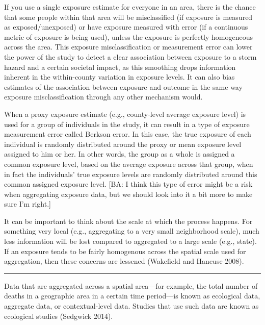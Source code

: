 \documentclass[]{article}
\begin{document}
If you use a single exposure estimate for everyone in an area, there is
the chance that some people within that area will be misclassified (if
exposure is measured as exposed/unexposed) or have exposure measured
with error (if a continuous metric of exposure is being used), unless
the exposure is perfectly homogeneous across the area. This exposure
misclassification or measurement error can lower the power of the study
to detect a clear association between exposure to a storm hazard and a
certain societal impact, as this smoothing drops information inherent in
the within-county variation in exposure levels. It can also bias
estimates of the association between exposure and outcome in the same
way exposure misclassification through any other mechanism would.

When a proxy exposure estimate (e.g., county-level average exposure
level) is used for a group of individuals in the study, it can result in
a type of exposure measurement error called Berkson error. In this case,
the true exposure of each individual is randomly distributed around the
proxy or mean exposure level assigned to him or her. In other words, the
group as a whole is assigned a common exposure level, based on the
average exposure across that group, when in fact the individuals' true
exposure levels are randomly distributed around this common assigned
exposure level. {[}BA: I think this type of error might be a risk when
aggregating exposure data, but we should look into it a bit more to make
sure I'm right.{]}

It can be important to think about the scale at which the process
happens. For something very local (e.g., aggregating to a very small
neighborhood scale), much less information will be lost compared to
aggregated to a large scale (e.g., state). If an exposure tends to be
fairly homogenous across the spatial scale used for aggregation, then
these concerns are lessened (Wakefield and Haneuse 2008).

\begin{center}\rule{0.5\linewidth}{0.5pt}\end{center}

Data that are aggregated across a spatial area---for example, the total
number of deaths in a geographic area in a certain time period---is
known as ecological data, aggregate data, or contextual-level data.
Studies that use such data are known as ecological studies (Sedgwick
2014).
\end{document}
